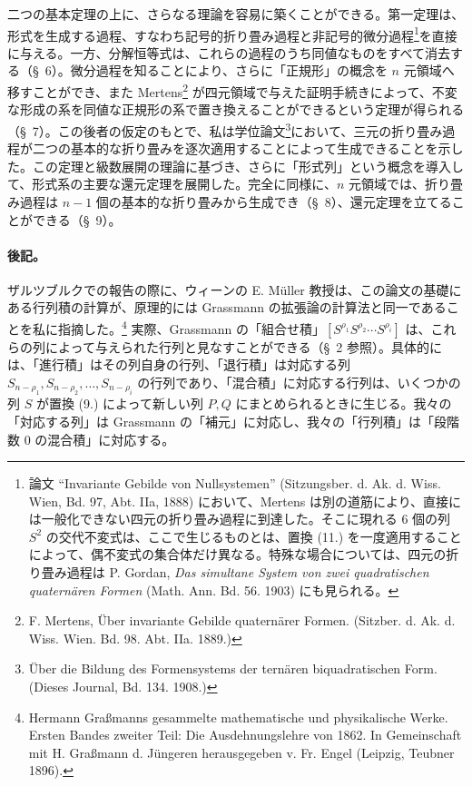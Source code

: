 \documentclass[11pt]{jlreq}
\begin{document}
二つの基本定理の上に、さらなる理論を容易に築くことができる。第一定理は、形式を生成する過程、すなわち記号的折り畳み過程と非記号的微分過程\footnote{論文 ``Invariante Gebilde von Nullsystemen'' (Sitzungsber. d. Ak. d. Wiss. Wien, Bd. 97, Abt. IIa, 1888) において、Mertens は別の道筋により、直接には一般化できない四元の折り畳み過程に到達した。そこに現れる 6 個の列 $S^2$ の交代不変式は、ここで生じるものとは、置換 (11.) を一度適用することによって、偶不変式の集合体だけ異なる。特殊な場合については、四元の折り畳み過程は P. Gordan, \emph{Das simultane System von zwei quadratischen quaternären Formen} (Math. Ann. Bd. 56. 1903) にも見られる。}を直接に与える。一方、分解恒等式は、これらの過程のうち同値なものをすべて消去する（\S\ 6）。微分過程を知ることにより、さらに「正規形」の概念を $n$ 元領域へ移すことができ、また Mertens\footnote{F. Mertens, Über invariante Gebilde quaternärer Formen. (Sitzber. d. Ak. d. Wiss. Wien. Bd. 98. Abt. IIa. 1889.)} が四元領域で与えた証明手続きによって、不変な形成の系を同値な正規形の系で置き換えることができるという定理が得られる（\S\ 7）。この後者の仮定のもとで、私は学位論文\footnote{Über die Bildung des Formensystems der ternären biquadratischen Form. (Dieses Journal, Bd. 134. 1908.)}において、三元の折り畳み過程が二つの基本的な折り畳みを逐次適用することによって生成できることを示した。この定理と級数展開の理論に基づき、さらに「形式列」という概念を導入して、形式系の主要な還元定理を展開した。完全に同様に、$n$ 元領域では、折り畳み過程は $n-1$ 個の基本的な折り畳みから生成でき（\S\ 8）、還元定理を立てることができる（\S\ 9）。

\paragraph{後記。} ザルツブルクでの報告の際に、ウィーンの E. Müller 教授は、この論文の基礎にある行列積の計算が、原理的には Grassmann の拡張論の計算法と同一であることを私に指摘した。\footnote{Hermann Graßmanns gesammelte mathematische und physikalische Werke. Ersten Bandes zweiter Teil: Die Ausdehnungslehre von 1862. In Gemeinschaft mit H. Graßmann d. Jüngeren herausgegeben v. Fr. Engel (Leipzig, Teubner 1896).} 実際、Grassmann の「組合せ積」$[S^{\rho_1}S^{\rho_2}\cdots S^{\rho_i}]$ は、これらの列によって与えられた行列と見なすことができる（\S\ 2 参照）。具体的には、「進行積」はその列自身の行列、「退行積」は対応する列 $S_{n-\rho_1},S_{n-\rho_2},\ldots,S_{n-\rho_i}$ の行列であり、「混合積」に対応する行列は、いくつかの列 $S$ が置換 (9.) によって新しい列 $P,Q$ にまとめられるときに生じる。我々の「対応する列」は Grassmann の「補元」に対応し、我々の「行列積」は「段階数 0 の混合積」に対応する。
\end{document}
